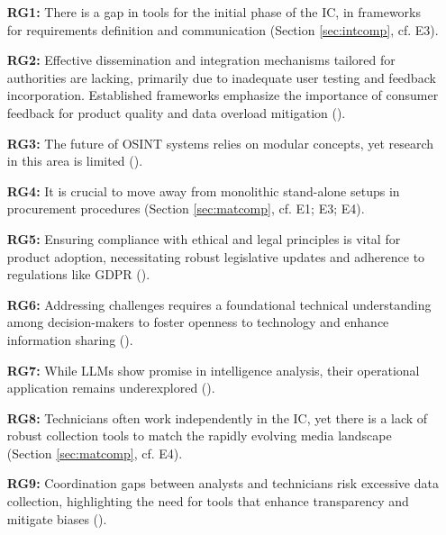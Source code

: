\documentclass[10pt]{article}
\begin{document}
\begin{itemize}
    \item[\textbf{RG1:}] There is a gap in tools for the initial phase of the IC, in frameworks for requirements definition and communication (Section \ref{sec:intcomp}, cf. E3).

        \item[\textbf{RG2:}] Effective dissemination and integration mechanisms tailored for authorities are lacking, primarily due to inadequate user testing and feedback incorporation. Established frameworks emphasize the importance of consumer feedback for product quality and data overload mitigation (\cite{JointChiefsofStaffU.S.Army.2013, NorthAtlanticTreatyOrganization.2001}).

        \item[\textbf{RG3:}] The future of OSINT systems relies on modular concepts, yet research in this area is limited (\cite{Arjun.2020,Wright.2020}).
        
        \item[\textbf{RG4:}] It is crucial to move away from monolithic stand-alone setups in procurement procedures (Section \ref{sec:matcomp}, cf. E1; E3; E4).
        
        \item[\textbf{RG5:}] Ensuring compliance with ethical and legal principles is vital for product adoption, necessitating robust legislative updates and adherence to regulations like GDPR (\cite{EuropeanParliament.2016, Wittmer.2022}).
        
        \item[\textbf{RG6:}] Addressing challenges requires a foundational technical understanding among decision-makers to foster openness to technology and enhance information sharing (\cite{NorthAtlanticTreatyOrganization.2001}).
        
        \item[\textbf{RG7:}] While LLMs show promise in intelligence analysis, their operational application remains underexplored (\cite{Radford.2023}).
        
        \item[\textbf{RG8:}] Technicians often work independently in the IC, yet there is a lack of robust collection tools to match the rapidly evolving media landscape (Section \ref{sec:matcomp}, cf. E4).
        
        \item[\textbf{RG9:}] Coordination gaps between analysts and technicians risk excessive data collection, highlighting the need for tools that enhance transparency and mitigate biases (\cite{Lowenthal.2020}).        
\end{itemize}
\end{document}
